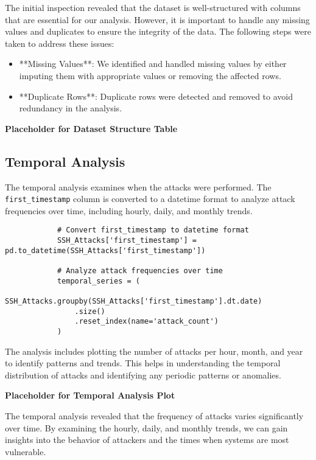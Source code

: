         The initial inspection revealed that the dataset is well-structured with columns that are essential for our analysis. However, it is important to handle any missing values and duplicates to ensure the integrity of the data. The following steps were taken to address these issues:

        \begin{itemize}
            \item **Missing Values**: We identified and handled missing values by either imputing them with appropriate values or removing the affected rows.
            \item **Duplicate Rows**: Duplicate rows were detected and removed to avoid redundancy in the analysis.
        \end{itemize}

        \textbf{Placeholder for Dataset Structure Table}

    \subsection{Temporal Analysis}
    
        The temporal analysis examines when the attacks were performed. The \texttt{first\_timestamp} column is converted to a datetime format to analyze attack frequencies over time, including hourly, daily, and monthly trends.

        \begin{verbatim}
            # Convert first_timestamp to datetime format
            SSH_Attacks['first_timestamp'] = pd.to_datetime(SSH_Attacks['first_timestamp'])

            # Analyze attack frequencies over time
            temporal_series = (
                SSH_Attacks.groupby(SSH_Attacks['first_timestamp'].dt.date)
                .size()
                .reset_index(name='attack_count')
            )
        \end{verbatim}

        The analysis includes plotting the number of attacks per hour, month, and year to identify patterns and trends. This helps in understanding the temporal distribution of attacks and identifying any periodic patterns or anomalies.

        \textbf{Placeholder for Temporal Analysis Plot}

        The temporal analysis revealed that the frequency of attacks varies significantly over time. By examining the hourly, daily, and monthly trends, we can gain insights into the behavior of attackers and the times when systems are most vulnerable.

